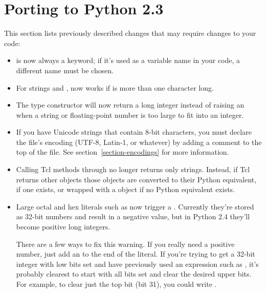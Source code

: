 \documentclass{howto}
\begin{document}
\section{Porting to Python 2.3}

This section lists previously described changes that may require
changes to your code:

\begin{itemize}

\item {} is now always a keyword; if it's used as a
variable name in your code, a different name must be chosen.

\item For strings  and ,  now works
if  is more than one character long.

\item The  type constructor will now return a long
integer instead of raising an  when a string
or floating-point number is too large to fit into an integer.

\item If you have Unicode strings that contain 8-bit characters, you
must declare the file's encoding (UTF-8, Latin-1, or whatever) by
adding a comment to the top of the file.  See
section~\ref{section-encodings} for more information.

\item Calling Tcl methods through  no longer 
returns only strings. Instead, if Tcl returns other objects those
objects are converted to their Python equivalent, if one exists, or
wrapped with a  object if no Python equivalent
exists.

\item Large octal and hex literals such as
 now trigger a . Currently
they're stored as 32-bit numbers and result in a negative value, but
in Python 2.4 they'll become positive long integers. 

There are a few ways to fix this warning.  If you really need a
positive number, just add an  to the end of the literal.  If
you're trying to get a 32-bit integer with low bits set and have
previously used an expression such as ,
it's probably
clearest to start with all bits set and clear the desired upper bits.
For example, to clear just the top bit (bit 31), you could write
.


\end{itemize}
\end{document}
